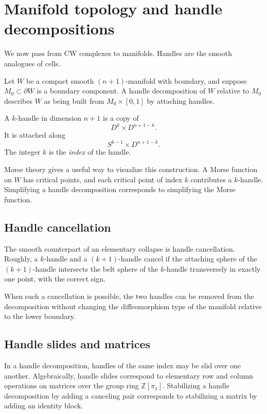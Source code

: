 \documentclass[11pt,a4paper]{article}
\newcommand{\ZZ}{\mathbb{Z}}
\theoremstyle{definition}
\theoremstyle{plain}
\theoremstyle{remark}
\begin{document}
\section{Manifold topology and handle decompositions}

We now pass from CW complexes to manifolds. Handles are the smooth analogues of cells.

Let \(W\) be a compact smooth \((n+1)\)-manifold with boundary, and suppose \(M_0\subset\partial W\) is a boundary component. A handle decomposition of \(W\) relative to \(M_0\) describes \(W\) as being built from \(M_0\times[0,1]\) by attaching handles.

A \(k\)-handle in dimension \(n+1\) is a copy of
\[
  D^k\times D^{n+1-k}.
\]
It is attached along
\[
  S^{k-1}\times D^{n+1-k}.
\]
The integer \(k\) is the \emph{index} of the handle.

Morse theory gives a useful way to visualize this construction. A Morse function on \(W\) has critical points, and each critical point of index \(k\) contributes a \(k\)-handle. Simplifying a handle decomposition corresponds to simplifying the Morse function.

\subsection{Handle cancellation}

The smooth counterpart of an elementary collapse is handle cancellation. Roughly, a \(k\)-handle and a \((k+1)\)-handle cancel if the attaching sphere of the \((k+1)\)-handle intersects the belt sphere of the \(k\)-handle transversely in exactly one point, with the correct sign.

When such a cancellation is possible, the two handles can be removed from the decomposition without changing the diffeomorphism type of the manifold relative to the lower boundary.

\subsection{Handle slides and matrices}

In a handle decomposition, handles of the same index may be slid over one another. Algebraically, handle slides correspond to elementary row and column operations on matrices over the group ring \(\ZZ[\pi_1]\). Stabilizing a handle decomposition by adding a canceling pair corresponds to stabilizing a matrix by adding an identity block.
\end{document}
